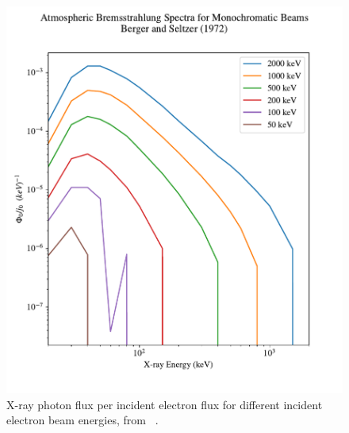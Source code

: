 \begin{figure}[p]
\label{berger_seltzer_curves_0}
\centering
\includegraphics[width=1.0\textwidth]{figures/chapter_3/berger-seltzer-curves/berger_seltzer_curves_0}
\caption{X-ray photon flux per incident electron flux for different incident electron beam energies, from ~\cite{Berger1972}. }
\end{figure}

